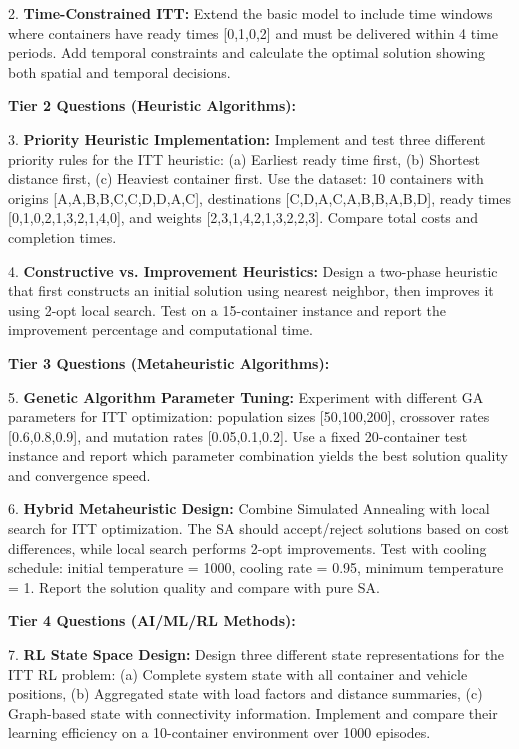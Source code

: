 \documentclass{article}
\begin{document}
2. \textbf{Time-Constrained ITT:} Extend the basic model to include time windows where containers have ready times [0,1,0,2] and must be delivered within 4 time periods. Add temporal constraints and calculate the optimal solution showing both spatial and temporal decisions.

\textbf{Tier 2 Questions (Heuristic Algorithms):}

3. \textbf{Priority Heuristic Implementation:} Implement and test three different priority rules for the ITT heuristic: (a) Earliest ready time first, (b) Shortest distance first, (c) Heaviest container first. Use the dataset: 10 containers with origins [A,A,B,B,C,C,D,D,A,C], destinations [C,D,A,C,A,B,B,A,B,D], ready times [0,1,0,2,1,3,2,1,4,0], and weights [2,3,1,4,2,1,3,2,2,3]. Compare total costs and completion times.

4. \textbf{Constructive vs. Improvement Heuristics:} Design a two-phase heuristic that first constructs an initial solution using nearest neighbor, then improves it using 2-opt local search. Test on a 15-container instance and report the improvement percentage and computational time.

\textbf{Tier 3 Questions (Metaheuristic Algorithms):}

5. \textbf{Genetic Algorithm Parameter Tuning:} Experiment with different GA parameters for ITT optimization: population sizes [50,100,200], crossover rates [0.6,0.8,0.9], and mutation rates [0.05,0.1,0.2]. Use a fixed 20-container test instance and report which parameter combination yields the best solution quality and convergence speed.

6. \textbf{Hybrid Metaheuristic Design:} Combine Simulated Annealing with local search for ITT optimization. The SA should accept/reject solutions based on cost differences, while local search performs 2-opt improvements. Test with cooling schedule: initial temperature = 1000, cooling rate = 0.95, minimum temperature = 1. Report the solution quality and compare with pure SA.

\textbf{Tier 4 Questions (AI/ML/RL Methods):}

7. \textbf{RL State Space Design:} Design three different state representations for the ITT RL problem: (a) Complete system state with all container and vehicle positions, (b) Aggregated state with load factors and distance summaries, (c) Graph-based state with connectivity information. Implement and compare their learning efficiency on a 10-container environment over 1000 episodes.
\end{document}
